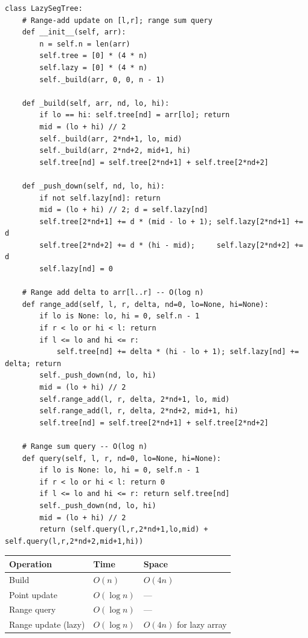\documentclass[11pt,a4paper]{report}
\begin{document}
\begin{lstlisting}
class LazySegTree:
    # Range-add update on [l,r]; range sum query
    def __init__(self, arr):
        n = self.n = len(arr)
        self.tree = [0] * (4 * n)
        self.lazy = [0] * (4 * n)
        self._build(arr, 0, 0, n - 1)

    def _build(self, arr, nd, lo, hi):
        if lo == hi: self.tree[nd] = arr[lo]; return
        mid = (lo + hi) // 2
        self._build(arr, 2*nd+1, lo, mid)
        self._build(arr, 2*nd+2, mid+1, hi)
        self.tree[nd] = self.tree[2*nd+1] + self.tree[2*nd+2]

    def _push_down(self, nd, lo, hi):
        if not self.lazy[nd]: return
        mid = (lo + hi) // 2; d = self.lazy[nd]
        self.tree[2*nd+1] += d * (mid - lo + 1); self.lazy[2*nd+1] += d
        self.tree[2*nd+2] += d * (hi - mid);     self.lazy[2*nd+2] += d
        self.lazy[nd] = 0

    # Range add delta to arr[l..r] -- O(log n)
    def range_add(self, l, r, delta, nd=0, lo=None, hi=None):
        if lo is None: lo, hi = 0, self.n - 1
        if r < lo or hi < l: return
        if l <= lo and hi <= r:
            self.tree[nd] += delta * (hi - lo + 1); self.lazy[nd] += delta; return
        self._push_down(nd, lo, hi)
        mid = (lo + hi) // 2
        self.range_add(l, r, delta, 2*nd+1, lo, mid)
        self.range_add(l, r, delta, 2*nd+2, mid+1, hi)
        self.tree[nd] = self.tree[2*nd+1] + self.tree[2*nd+2]

    # Range sum query -- O(log n)
    def query(self, l, r, nd=0, lo=None, hi=None):
        if lo is None: lo, hi = 0, self.n - 1
        if r < lo or hi < l: return 0
        if l <= lo and hi <= r: return self.tree[nd]
        self._push_down(nd, lo, hi)
        mid = (lo + hi) // 2
        return (self.query(l,r,2*nd+1,lo,mid) + self.query(l,r,2*nd+2,mid+1,hi))
\end{lstlisting}

\begin{compbox}
\begin{tabular}{@{}lll@{}}
\toprule
\textbf{Operation} & \textbf{Time} & \textbf{Space} \\
\midrule
Build           & $O(n)$        & $O(4n)$ \\
Point update    & $O(\log n)$   & --- \\
Range query     & $O(\log n)$   & --- \\
Range update (lazy) & $O(\log n)$ & $O(4n)$ for lazy array \\
\bottomrule
\end{tabular}
\end{compbox}
\end{document}
